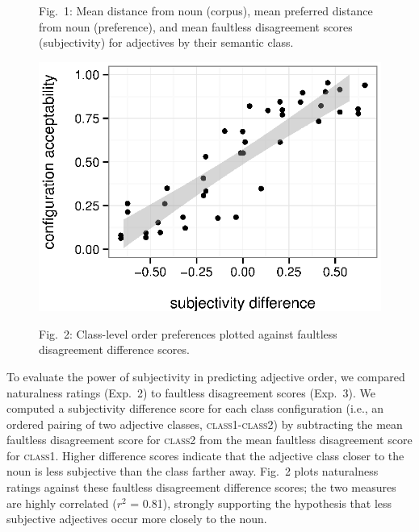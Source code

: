 \documentclass[12pt]{article}
\begin{document}
\begin{figure}
\begin{center}
	\end{center}
	\vspace{-15pt}
	Fig.~1: Mean distance from noun (corpus), mean preferred distance from noun  (preference), and mean faultless disagreement scores (subjectivity) for adjectives by their semantic class.
	\vspace{-10pt}
	\begin{center}
		\includegraphics[width=.9\linewidth]{plots/comparison2.eps}
	\end{center}
	\vspace{-10pt}
	Fig.~2: Class-level order preferences plotted against faultless disagreement difference scores.
\end{figure}
\vspace{-15pt}

To evaluate the power of subjectivity in predicting adjective order, we compared naturalness ratings (Exp.~2) to faultless disagreement scores (Exp.~3). We  computed a subjectivity difference score for each class configuration (i.e., an ordered pairing of two adjective classes, \textsc{class1}-\textsc{class2}) by subtracting the mean faultless disagreement score for \textsc{class2} from the mean faultless disagreement score for \textsc{class1}. Higher difference scores indicate that the adjective class closer to the noun is less subjective than the class farther away. Fig.~2 plots naturalness ratings  against these faultless disagreement difference scores; the two measures are highly correlated ($r^2$ = 0.81), strongly supporting the hypothesis that less subjective adjectives occur more closely to the noun.
\end{document}
